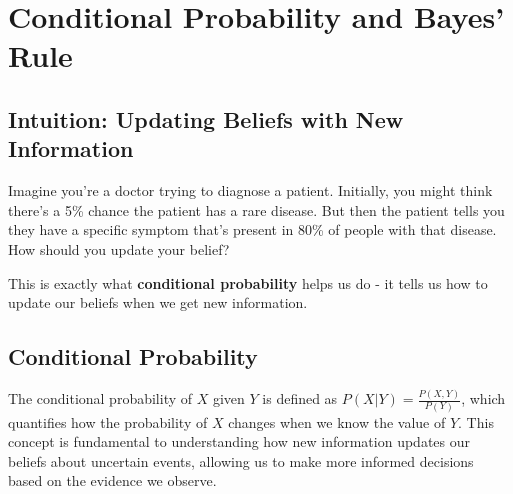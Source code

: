 
\section{Conditional Probability and Bayes' Rule }
\label{sec:conditional-probability}

\subsection{Intuition: Updating Beliefs with New Information}

Imagine you're a doctor trying to diagnose a patient. Initially, you might think there's a 5\% chance the patient has a rare disease. But then the patient tells you they have a specific symptom that's present in 80\% of people with that disease. How should you update your belief?

This is exactly what \textbf{conditional probability} helps us do - it tells us how to update our beliefs when we get new information.

\subsection{Conditional Probability}

The conditional probability of $X$ given $Y$ is defined as $P(X|Y) = \frac{P(X, Y)}{P(Y)}$, which quantifies how the probability of $X$ changes when we know the value of $Y$. This concept is fundamental to understanding how new information updates our beliefs about uncertain events, allowing us to make more informed decisions based on the evidence we observe.

